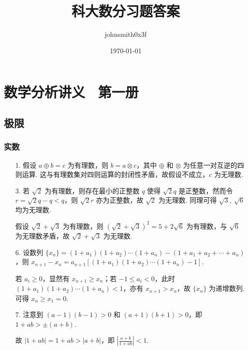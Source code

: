 \documentclass[oneside]{ctexbook} %
\title{科大数分习题答案}
\author{johnsmith0x3f}
\date{\today} %
\begin{document}
\maketitle

\newpage

\frontmatter

\tableofcontents

\newpage

\mainmatter

\part*{数学分析讲义 \ 第一册}

\thispagestyle{empty}

\newpage

\chapter{极限}

\section{实数}

\begin{enumerate}
    \item[1.]
    假设 $a \oplus b = c$ 为有理数，则 $b = a \otimes c$，其中 $\oplus$ 和 $\otimes$ 为任意一对互逆的四则运算. 这与有理数集对四则运算的封闭性矛盾，故假设不成立，$c$ 为无理数.
    \item[3.]
    若 $\sqrt 2$ 为有理数，则存在最小的正整数 $q$ 使得 $\sqrt 2 q$ 是正整数，然而令 $r = \sqrt 2 q - q < q$，则 $\sqrt 2 r$ 亦为正整数，故 $\sqrt 2$ 为无理数. 同理可得 $\sqrt 3,\ \sqrt 6$ 均为无理数.
    
    假设 $\sqrt 2 + \sqrt 3$ 为有理数，则 $(\sqrt 2 + \sqrt 3)^2 = 5 + 2 \sqrt 6$ 为有理数，与 $\sqrt 6$ 为无理数矛盾，故 $\sqrt 2 + \sqrt 3$ 为无理数.
    \item[6.]
    设数列 $\{ x_n \} = (1+a_1)(1+a_2)\cdots(1+a_n) - (1+a_1+a_2+\cdots+a_n)$，则 $x_{n+1} - x_n = a_{n+1} \left[ (1+a_1)(1+a_2)\cdots(1+a_n)-1 \right]$.
    
    若 $a_i \geqslant 0$，显然有 $x_{n+1} \geqslant x_n$；若 $-1 \leqslant a_i < 0$，此时 $(1+a_1)(1+a_2)\cdots(1+a_n) < 1$，亦有 $x_{n+1} > x_n$，故 $\{ x_n \}$ 为递增数列. 可得 $x_n \geqslant x_1 = 0$.
    \item[7.]
    注意到 $(a-1)(b-1) > 0$ 和 $(a+1)(b+1) > 0$，即 $1+ab > \pm(a+b)$.
    
    故 $|1+ab| = 1+ab > |a+b|$，即 $\left| \frac{a+b}{1+ab} \right| < 1$.
\end{enumerate}
\end{document}
